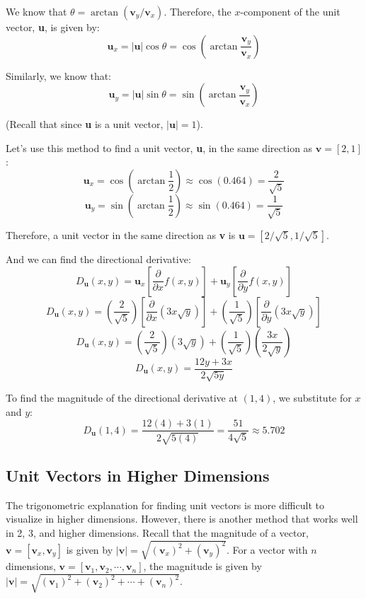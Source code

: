We know that $\theta = \arctan{ \left( \textbf{v}_y / \textbf{v}_x \right)}$. 
Therefore, the $x$-component of the unit vector, \textbf{u}, is given by:
$$\textbf{u}_x = |\textbf{u}| \cos{ \theta} = \cos{ \left( \arctan{ \frac{
\textbf{v}_y}{\textbf{v}_x}} \right)}$$

Similarly, we know that:
$$\textbf{u}_y = |\textbf{u}| \sin{ \theta} = \sin{ \left( \arctan{ \frac{
\textbf{v}_y}{\textbf{v}_x}} \right)}$$

(Recall that since \textbf{u} is a unit vector, $|\textbf{u}| = 1$). 

Let's use this method to find a unit vector, \textbf{u}, in the same direction 
as $\textbf{v} = \left[ 2, 1 \right]$:
$$\textbf{u}_x = \cos{ \left( \arctan{ \frac{1}{2} } \right) } \approx \cos{ 
\left( 0.464 \right) } = \frac{2}{\sqrt{5}}$$
$$\textbf{u}_y = \sin{ \left( \arctan{ \frac{1}{2} } \right) } \approx \sin{ 
\left( 0.464 \right)} = \frac{1}{\sqrt{5}}$$

Therefore, a unit vector in the same direction as \textbf{v} is $\textbf{u} = 
\left[ 2/\sqrt{5}, 1/\sqrt{5} \right]$. 

And we can find the directional derivative:
$$D_{\textbf{u}}(x, y) = \textbf{u}_x \left[ \frac{\partial}{\partial x} f(x, 
y) \right] + \textbf{u}_y \left[ \frac{\partial}{\partial y} f(x, y) \right]$$
$$D_{\textbf{u}}(x, y) = \left( \frac{2}{\sqrt{5}} \right) \left[ \frac{
\partial}{\partial x} \left( 3x\sqrt{y} \right) \right] + \left( \frac{1}{
\sqrt{5}} \right) \left[ \frac{\partial}{\partial y} \left( 3x\sqrt{y} \right) 
\right]$$
$$D_{\textbf{u}}(x, y) = \left( \frac{2}{\sqrt{5}} \right) \left( 3\sqrt{y} 
\right) + \left( \frac{1}{\sqrt{5}} \right) \left( \frac{3x}{2\sqrt{y}} 
\right)$$
$$D_{\textbf{u}}(x, y) = \frac{12y + 3x}{2\sqrt{5y}}$$

To find the magnitude of the directional derivative at $(1, 4)$, we 
substitute for $x$ and $y$:
$$D_{\textbf{u}}(1, 4) = \frac{12(4) + 3(1)}{2\sqrt{5(4)}} = \frac{51}{4\sqrt{5}} 
\approx 5.702$$

\subsection{Unit Vectors in Higher Dimensions}
The trigonometric explanation for finding unit vectors is more difficult to 
visualize in higher dimensions. However, there is another method that works 
well in 2, 3, and higher dimensions. Recall that the magnitude of a vector, 
$\textbf{v} = \left[ \textbf{v}_x, \textbf{v}_y \right]$ is given by $| 
\textbf{v} | = \sqrt{\left( \textbf{v}_x \right)^2 + \left( \textbf{v}_y 
\right)^2}$. For a vector with $n$ dimensions, $\textbf{v} = \left[ \textbf{v}_
1, \textbf{v}_2, \cdots , \textbf{v}_n \right]$, the magnitude is given by $| 
\textbf{v} | = \sqrt{ \left( \textbf{v}_1 \right)^2 + \left( \textbf{v}_2 
\right)^2 + \cdots + \left( \textbf{v}_n \right)^2}$. 

